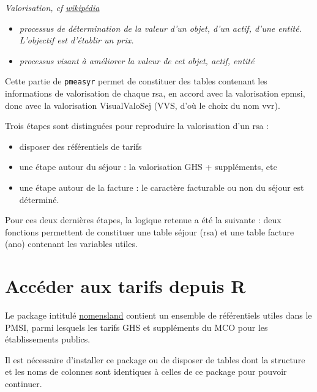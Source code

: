 \documentclass[]{book}
\newenvironment{Shaded}{\begin{snugshade}}{\end{snugshade}}
\newcommand{\DataTypeTok}[1]{\textcolor[rgb]{0.13,0.29,0.53}{#1}}
\newcommand{\DecValTok}[1]{\textcolor[rgb]{0.00,0.00,0.81}{#1}}
\newcommand{\KeywordTok}[1]{\textcolor[rgb]{0.13,0.29,0.53}{\textbf{#1}}}
\newcommand{\NormalTok}[1]{#1}
\newcommand{\OperatorTok}[1]{\textcolor[rgb]{0.81,0.36,0.00}{\textbf{#1}}}
\newcommand{\OtherTok}[1]{\textcolor[rgb]{0.56,0.35,0.01}{#1}}
\newcommand{\StringTok}[1]{\textcolor[rgb]{0.31,0.60,0.02}{#1}}
\providecommand{\tightlist}{%
  \setlength{\itemsep}{0pt}\setlength{\parskip}{0pt}}
\begin{document}
\emph{Valorisation, cf \href{https://fr.wikipedia.org/wiki/Valorisation}{wikipédia}}

\begin{itemize}
\tightlist
\item
  \emph{processus de détermination de la valeur d'un objet, d'un actif, d'une entité. L'objectif est d'établir un prix.}
\item
  \emph{processus visant à améliorer la valeur de cet objet, actif, entité}
\end{itemize}

Cette partie de \texttt{pmeasyr} permet de constituer des tables contenant les informations de valorisation de chaque rsa, en accord avec la valorisation epmsi, donc avec la valorisation VisualValoSej (VVS, d'où le choix du nom vvr).

Trois étapes sont distinguées pour reproduire la valorisation d'un rsa :

\begin{itemize}
\tightlist
\item
  disposer des référentiels de tarifs
\item
  une étape autour du séjour : la valorisation GHS + suppléments, etc
\item
  une étape autour de la facture : le caractère facturable ou non du séjour est déterminé.
\end{itemize}

Pour ces deux dernières étapes, la logique retenue a été la suivante : deux fonctions permettent de constituer une table séjour (rsa) et une table facture (ano) contenant les variables utiles.

\hypertarget{acceder-aux-tarifs-depuis-r}{%
\section{Accéder aux tarifs depuis R}\label{acceder-aux-tarifs-depuis-r}}

Le package intitulé \href{https://guillaumepressiat.github.io/nomensland/index.html}{nomensland} contient un ensemble de référentiels utiles dans le PMSI, parmi lesquels les tarifs GHS et suppléments du MCO pour les établissements publics.

Il est nécessaire d'installer ce package ou de disposer de tables dont la structure et les noms de colonnes sont identiques à celles de ce package pour pouvoir continuer.

\begin{Shaded}
\end{Shaded}
\end{document}
